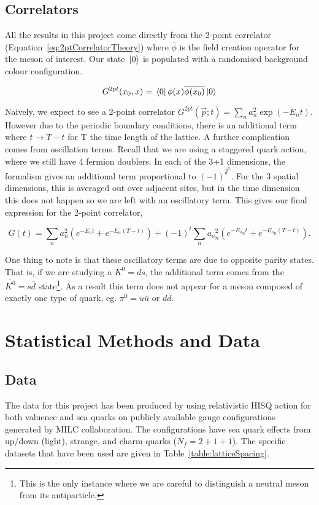 \documentclass[a4paper,12pt]{article}
\begin{document}
\subsection{Correlators}
All the results in this project come directly from the 2-point correlator (Equation~\ref{eq:2ptCorrelatorTheory}) where $\overline{\phi}$ is the field creation operator for the meson of interest. Our state $\ket*{0}$ is populated with a randomised background colour configuration.

\begin{equation}
    \label{eq:2ptCorrelatorTheory}
    G^{2pt}(x_0, x) = \bra*{0}\phi(x)\overline{\phi(x_0)}\ket*{0}
\end{equation}

Naively, we expect\cite{2016Chakraborty} to see a 2-point correlator $G^{2pt}(\overrightarrow{p}; t) = \sum_n a_n^2 \exp(-E_n t)$. However due to the periodic boundary conditions, there is an additional term where $t \rightarrow T-t$ for T the time length of the lattice. A further complication comes from oscillation terms. Recall that we are using a staggered quark action, where we still have 4 fermion doublers. In each of the 3+1 dimensions, the formalism gives an additional term proportional to ${(-1)}^{\hat{\delta}^\mu}$. For the 3 spatial dimensions, this is averaged out over adjacent sites, but in the time dimension this does not happen so we are left with an oscillatory term. This gives our final expression for the 2-point correlator,

\begin{equation}
    \label{eq:2ptCorrelator}
    G(t) = \sum_n a_n^2 (e^{-E_n t} + e^{-E_n(T-t)}) + {(-1)}^t \sum_n {a_o}_n^2 (e^{-{E_o}_n t} + e^{{-E_o}_n (T-t)}).
\end{equation}

One thing to note is that these oscillatory terms are due to opposite parity states. That is, if we are studying a $K^0=d \overline{s}$, the additional term comes from the $\overline{K^0}=s\overline{d}$ state\footnote{This is the only instance where we are careful to distinguish a neutral meson from its antiparticle.}. As a result this term does not appear for a meson composed of exactly one type of quark, eg. $\pi^0 = u\overline{u}$ or $d\overline{d}$.

\section{Statistical Methods and Data}
\subsection{Data}
The data for this project has been produced by using relativistic HISQ action for both valuence and sea quarks on publicly available gauge configurations generated by MILC collaboration\cite{bazavov2013lattice}. The configurations have sea quark effects from up/down (light), strange, and charm quarks ($N_f = 2+1+1$). The specific datasets that have been used are given in Table~\ref{table:latticeSpacing}.
\end{document}
